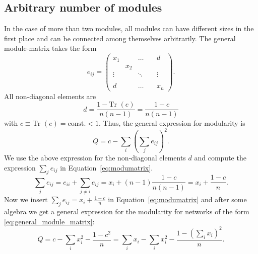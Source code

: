 \subsection{Arbitrary number of modules}
In the case of more than two modules, all modules can have different sizes in the first place and can be connected among themselves arbitrarily.
The general module-matrix takes the form
\begin{equation}\label{eq:general_module_matrix}
e_{ij}=\left(\begin{array}{ccccc}x_1 &  & \hdots &  & d \\ & x_2 &  &  &  \\\vdots &  & \ddots &  & \vdots \\ &  &  & \ &  \\d &  & \hdots &  & x_n\end{array}\right) .
\end{equation}
All non-diagonal elements are 
\[
d= \frac{1-\text{Tr } (e) }{n(n-1) } = \frac{1-c }{n(n-1) }
\]
with $c\equiv \text{Tr } (e)=\text{const.}<1$.
Thus, the general expression for modularity is
\begin{equation} \label{eq:modumatrix}
Q= c-\sum  _i \left( \sum _j e_{ij} \right)^2 .
\end{equation}
%
We use the above expression for the non-diagonal elements $d$ and compute the expression $\sum _j e_{ij}$ in Equation~\eqref{eq:modumatrix}.
\begin{equation}\label{eq:sumeij}
\sum _j e_{ij} = e_{ii} + \sum _{j\neq i} e_{ij} = x_i + (n-1) \frac{1-c}{n(n-1)} = x_i + \frac{1-c}{n}.
\end{equation}
%
Now we insert $\sum _j e_{ij}=x_i+\frac{1-c}{n}$ in Equation~\eqref{eq:modumatrix} and after some algebra we get a general expression for the modularity for networks of the form \eqref{eq:general_module_matrix}:
\begin{equation}\label{eq:Qndim}
Q=c-\sum _i x_i^2 - \frac{1-c^2}{n} = \sum _i x_i -\sum _i x_i^2 - \frac{1-(\sum _i x_i)^2}{n}.
\end{equation}

